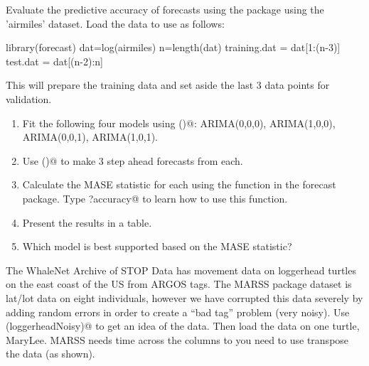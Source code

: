 \begin{hwenumerate}
\item\label{hw-uniss-6} Evaluate the predictive accuracy of forecasts using the \verb@forecast@ package using the 'airmiles' dataset.
Load the data to use as follows:

\begin{Schunk}
\begin{Sinput}
 library(forecast)
 dat=log(airmiles)
 n=length(dat)
 training.dat = dat[1:(n-3)]
 test.dat = dat[(n-2):n]
\end{Sinput}
\end{Schunk}

This will prepare the training data and set aside the last 3 data points for validation. 

\begin{enumerate}[label=\alph*)]
\item Fit the following four models using \verb@Arima()@: ARIMA(0,0,0), ARIMA(1,0,0), ARIMA(0,0,1), ARIMA(1,0,1).
\item Use \verb@forecast()@ to make 3 step ahead forecasts from each.
\item Calculate the MASE statistic for each using the \verb@accuracy@ function in the forecast package. Type \verb@?accuracy@ to learn how to use this function.
\item Present the results in a table.
\item Which model is best supported based on the MASE statistic?
\end{enumerate}


\item\label{hw-movement} The WhaleNet Archive of STOP Data has movement data on loggerhead turtles on the east coast of the US from ARGOS tags.  The MARSS package \verb@loggerheadNoisy@ dataset is lat/lot data on eight individuals, however we have corrupted this data severely by adding random errors in order to create a ``bad tag'' problem (very noisy).  Use \verb@head(loggerheadNoisy)@ to get an idea of the data.  Then load the data on one turtle, MaryLee.  MARSS needs time across the columns to you need to use transpose the data (as shown).
\begin{Schunk}
\end{Schunk}


\end{hwenumerate}
